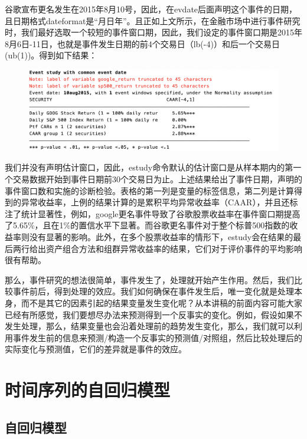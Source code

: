 \documentclass[cn,12pt,math=newtx,citestyle=gb7714-2015,bibstyle=gb7714-2015]{elegantbook}
\begin{document}
	谷歌宣布更名发生在2015年8月10号，因此，在evdate后面声明这个事件的日期，且日期格式dateformat是“月日年”。且正如上文所示，在金融市场中进行事件研究时，我们最好选取一个较短的事件窗口期，因此，我们设定的事件窗口期是2015年8月6日-11日，也就是事件发生日期的前4个交易日（lb(-4)）和后一个交易日(ub(1))。得到如下结果：
	
	\begin{figure}[tbph]
		\centering
		\includegraphics[width=1\linewidth, height=0.5\textheight]{estudy_result}
		\caption{}
		\label{fig:estudy_result}
	\end{figure}
	
	我们并没有声明估计窗口，因此，estudy命令默认的估计窗口是从样本期内的第一个交易数据开始到事件日期前30个交易日为止。上述结果给出了事件日期，声明的事件窗口数和实施的诊断检验。表格的第一列是变量的标签信息，第二列是计算得到的异常收益率，上例的结果计算的是累积平均异常收益率（CAAR），并且还标注了统计显著性，例如，google更名事件导致了谷歌股票收益率在事件窗口期提高了5.65\%，且在1\%的置信水平下显著。而谷歌更名事件对于整个标普500指数的收益率则没有显著的影响。此外，在多个股票收益率的情形下，estudy会在结果的最后两行给出资产组合方法和组群异常收益率的结果，它们对于评价事件的平均影响很有帮助。
	
	那么，事件研究的想法很简单，事件发生了，处理就开始产生作用。然后，我们比较事件前后，得到处理的效应。我们如何确保在事件发生后，唯一变化就是处理本身，而不是其它的因素引起的结果变量发生变化呢？从本讲稿的前面内容可能大家已经有所感觉，我们要想尽办法来预测得到一个反事实的变化。例如，假设如果不发生处理，那么，结果变量也会沿着处理前的趋势发生变化，那么，我们就可以利用事件发生前的信息来预测/构造一个反事实的预测值/对照组，然后比较处理后的实际变化与预测值，它们的差异就是事件的效应。
	
	
	
	\chapter{时间序列的自回归模型}
	
	\section{自回归模型}
	
\end{document}
